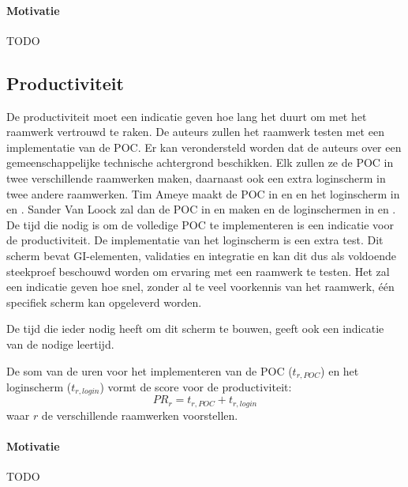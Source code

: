 \paragraph{Motivatie}
TODO


\subsection{Productiviteit}
\label{sec:vergelijking-productiviteit}
De productiviteit moet een indicatie geven hoe lang het duurt om met het raamwerk vertrouwd te raken.
De auteurs zullen het raamwerk testen met een implementatie van de POC.
Er kan verondersteld worden dat de auteurs over een gemeenschappelijke technische achtergrond beschikken.
Elk zullen ze de POC in twee verschillende raamwerken maken,  daarnaast ook een extra loginscherm in twee andere raamwerken.
Tim Ameye maakt de POC in \jqm{} en \lungo{} en het loginscherm in \st{} en \kendo{}.
Sander Van Loock zal dan de POC in \st{} en \kendo{} maken en de loginschermen in \jqm{} en \lungo{}.
De tijd die nodig is om de volledige POC te implementeren is een indicatie voor de productiviteit. 
De implementatie van het loginscherm is een extra test.
Dit scherm bevat GI-elementen, validaties en  integratie en kan dit dus als voldoende steekproef beschouwd worden om ervaring met een raamwerk te testen.
Het zal een indicatie geven hoe snel,  zonder al te veel voorkennis van het raamwerk,  één specifiek scherm kan opgeleverd worden.

De tijd die ieder nodig heeft om dit scherm te bouwen, geeft ook een indicatie van de nodige leertijd.


De som van de uren voor het implementeren van de POC ($t_{r,POC}$) en het loginscherm ($t_{r,login}$) vormt de score voor de productiviteit:
\begin{equation}
  PR_r = {t_{r,POC} + t_{r,login}}
  \label{eq:productiviteit}
\end{equation}
waar $r$ de verschillende raamwerken voorstellen.

\paragraph{Motivatie}
TODO


